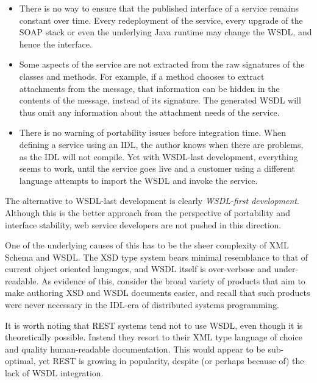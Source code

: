 \begin{itemize}

\item
    
There is no way to ensure that the published interface of a service
remains constant over time. Every redeployment of the service, every
upgrade of the SOAP stack or even the underlying Java runtime may
change the WSDL, and hence the interface.

\item

Some aspects of the service are not extracted from the raw signatures
of the classes and methods. For example, if a method chooses to extract
attachments from the message, that information can be hidden in the contents
of the message, instead of its signature. The generated WSDL will thus
omit any information about the attachment needs of the service.

\item

There is no warning of portability issues before integration time. 
When defining a service using an IDL, the author knows
when there are problems, as the IDL will not compile. Yet with WSDL-last
development, everything seems to work, until the service goes live and
a customer using a different language attempts to import the WSDL and
invoke the service.

    
\end{itemize}

The alternative to WSDL-last development is clearly \emph{WSDL-first
development}. Although this is the better approach from the perspective
of portability and interface stability, web service developers are not
pushed in this direction.

One of the underlying causes of this has to be the sheer complexity of
XML Schema and WSDL. The XSD type system bears minimal resemblance to
that of current object oriented languages, and WSDL itself is
over-verbose and under-readable. As evidence of this, consider the
broad variety of products that aim to make authoring XSD and WSDL
documents easier, and recall that such products were never necessary
in the IDL-era of distributed systems programming.

It is worth noting that REST systems \cite{fielding:rest} tend not to
use WSDL, even though it is theoretically possible. Instead they
resort to their XML type language of choice and quality human-readable
documentation. This would appear to be sub-optimal, yet REST is
growing in popularity, despite (or perhaps because of) the lack of
WSDL integration.

